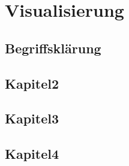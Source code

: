 \chapter{Visualisierung}
\section{Begriffsklärung}
\section{Kapitel2}
\section{Kapitel3}
\section{Kapitel4}
